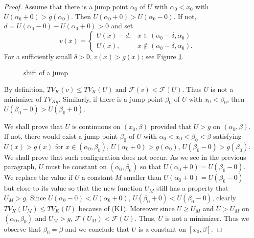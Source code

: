 \documentclass[10pt,a4paper]{amsart}
\begin{document}
\begin{proof}
Assume that there is a jump point $\alpha_0$ of $U$ with $\alpha_0<x_0$ with $U(\alpha_0+0)>g(\alpha_0)$.
 Then $U(\alpha_0+0)>U(\alpha_0-0)$.
 If not, $d=U(\alpha_0-0)-U(\alpha_0+0)>0$ and set
\[
	v(x) = \left\{
\begin{array}{lll}
	U(x) - d, & x \in (\alpha_0-\delta, \alpha_0) \\
	U(x), & x \notin (\alpha_0-\delta, \alpha_0).
\end{array}
\right.
\]
For a sufficiently small $\delta>0$, $v(x)>g(x)$; see Figure \ref{Fshi}.
\begin{figure}[tb]
\centering 

\caption{shift of a jump\label{Fshi}}
\end{figure}
By definition, $TV_K(v)\leq TV_K(U)$ and $\mathcal{F}(v)<\mathcal{F}(U)$.
 Thus $U$ is not a minimizer of $TV_{Kg}$.
 Similarly, if there is a jump point $\beta_0$ of $U$ with $x_0<\beta_0$, then $U(\beta_0-0)>U(\beta_0+0)$.

We shall prove that $U$ is continuous on $(x_0,\beta)$ provided that $U>g$ on $(\alpha_0,\beta)$.
 If not, there would exist a jump point $\beta_0$ of $U$ with $\alpha_0<x_0<\beta_0<\beta$ satisfying $U(x)>g(x)$ for $x\in(\alpha_0,\beta_0)$, $U(\alpha_0+0)>g(\alpha_0)$, $U(\beta_0-0)>g(\beta_0)$.
 We shall prove that such configuration does not occur.
 As we see in the previous paragraph, $U$ must be constant on $(\alpha_0,\beta_0)$ so that $U(\alpha_0+0)=U(\beta_0-0)$.
 We replace the value if $U$ a constant $M$ smaller than $U(\alpha_0+0)=U(\beta_0-0)$ but close to its value so that the new function $U_M$ still has a property that $U_M>g$.
 Since $U(\alpha_0-0)<U(\alpha_0+0)$, $U(\beta_0+0)<U(\beta_0-0)$, clearly $TV_K(U_M)\le TV_K(U)$ because of (K1).
 Moreover since $U\ge U_M$ and $U>U_M$ on $(\alpha_0,\beta_0)$ and $U_M>g$, $\mathcal{F}(U_M)<\mathcal{F}(U)$.
 Thus, $U$ is not a minimizer.
 Thus we observe that $\beta_0=\beta$ and we conclude that $U$ is a constant on $[x_0,\beta]$.
%


\end{proof}
\end{document}

